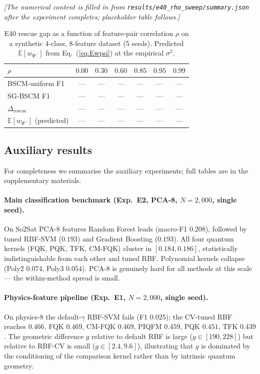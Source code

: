 \documentclass[pdflatex,sn-mathphys-num]{sn-jnl}
\theoremstyle{thmstyleone}
\theoremstyle{thmstyletwo}
\theoremstyle{thmstylethree}
\begin{document}
\noindent \emph{[The numerical content is filled in from
\texttt{results/e40\_rho\_sweep/summary.json} after the experiment
completes; placeholder table follows.]}

\begin{table}[htbp]
\caption{E40 rescue gap as a function of feature-pair correlation $\rho$
on a synthetic 4-class, 8-feature dataset (5 seeds). Predicted
$\mathbb{E}[w_{\Psi^-}]$ from Eq.~(\ref{eq:Ewpsi}) at the empirical
$\sigma^2$.}
\label{tab:e40}
\begin{tabular}{lcccccc}
\toprule
$\rho$ & $0.00$ & $0.30$ & $0.60$ & $0.85$ & $0.95$ & $0.99$ \\
\midrule
BSCM-uniform F1 & --- & --- & --- & --- & --- & --- \\
SG-BSCM F1      & --- & --- & --- & --- & --- & --- \\
$\Delta_{\mathrm{rescue}}$ & --- & --- & --- & --- & --- & --- \\
$\mathbb{E}[w_{\Psi^-}]$ (predicted) & --- & --- & --- & --- & --- & --- \\
\bottomrule
\end{tabular}
\end{table}

\subsection{Auxiliary results}\label{sec:aux-results}

For completeness we summarise the auxiliary experiments; full tables
are in the supplementary materials.

\paragraph{Main classification benchmark (Exp.\ E2, PCA-8,
$N=2{,}000$, single seed).}
On So2Sat PCA-8 features Random Forest leads (macro-F1 $0.208$),
followed by tuned RBF-SVM ($0.193$) and Gradient Boosting
($0.193$). All four quantum kernels (FQK, PQK, TFK, CM-FQK) cluster
in $[0.184,0.186]$, statistically indistinguishable from each other
and tuned RBF. Polynomial kernels collapse (Poly2 $0.074$, Poly3
$0.054$). PCA-8 is genuinely hard for all methods at this scale ---
the within-method spread is small.

\paragraph{Physics-feature pipeline (Exp.\ E1, $N=2{,}000$, single seed).}
On physics-8 the default-$\gamma$ RBF-SVM fails (F1 $0.025$); the CV-tuned
RBF reaches $0.466$, FQK $0.469$, CM-FQK $0.469$, PIQFM $0.459$, PQK
$0.451$, TFK $0.439$. The geometric difference $g$ relative to default
RBF is large ($g\in[190,228]$) but relative to RBF-CV is small
($g\in[2.4, 9.6]$), illustrating that $g$ is dominated by the conditioning
of the comparison kernel rather than by intrinsic quantum geometry.
\end{document}
